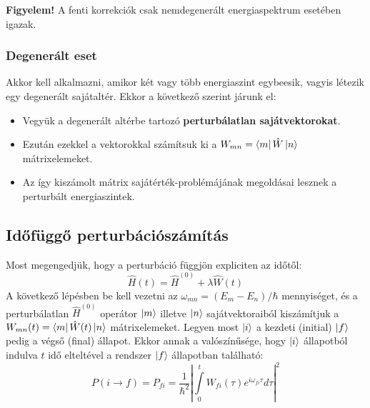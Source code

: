 \textbf{Figyelem!} A fenti korrekciók csak nemdegenerált energiaspektrum esetében igazak.

\subsubsection{Degenerált eset}
Akkor kell alkalmazni, amikor két vagy több energiaszint egybeesik, vagyis létezik egy degenerált sajátaltér.
Ekkor a következő szerint járunk el:
\begin{itemize}
    \item Vegyük a degenerált altérbe tartozó \textbf{perturbálatlan sajátvektorokat}. 
    \item Ezután ezekkel a vektorokkal számítsuk ki a $W_{mn} = \bra m \hat W \ket n$ mátrixelemeket.
    \item Az így kiszámolt mátrix sajátérték-problémájának megoldásai lesznek a perturbált energiaszintek.
\end{itemize}
\subsection{Időfüggő perturbációszámítás}
Most megengedjük, hogy a perturbáció függjön expliciten az időtől:
\begin{equation}
    \hat H(t) = \hat H^{(0)} + \lambda\hat W(t)
\end{equation}
A következő lépésben be kell vezetni az $\omega_{mn} = (E_m-E_n)/\hbar$ mennyiséget, és a 
perturbálatlan $\hat H^{(0)}$ operátor $\ket m$ illetve $\ket n$ sajátvektoraiból kiszámítjuk
a $W_{mn}(t) = \bra m \hat W(t)\ket n$ mátrixelemeket. Legyen most $\ket i$ a kezdeti (initial) $\ket f$
pedig a végső (final) állapot. Ekkor annak a valószínűsége, hogy $\ket i$ állapotból indulva $t$
idő elteltével a rendszer $\ket f$ állapotban található:
\begin{equation}
    P(i\rightarrow f) = P_{fi} = \frac{1}{\hbar^2}\left|\int\limits_0^t W_{fi}(\tau) e^{i\omega_{fi}\tau} d\tau\right|^2   
\end{equation}

